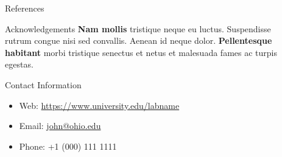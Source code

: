 \documentclass{beamer} %
\begin{document}
\begin{frame}[t]
\begin{columns}[t]
\begin{column}{0.465\textwidth}

\begin{block}{References}
	\nocite{*} %
	\small %
	\vspace{-1ex} %
\end{block}


\begin{block}{Acknowledgements}
	\textbf{Nam mollis} tristique neque eu luctus. Suspendisse rutrum congue nisi sed convallis. Aenean id neque dolor. \textbf{Pellentesque habitant} morbi tristique senectus et netus et malesuada fames ac turpis egestas.
\end{block}



\begin{block}{Contact Information}
	\begin{itemize}
		\item Web: \href{https://www.university.edu/labname}{https://www.university.edu/labname}
		\item Email: \href{mailto:john@ohio.edu}{john@ohio.edu}
		\item Phone: +1 (000) 111 1111
	\end{itemize}
\end{block}


\end{column} %

\begin{column}{0.02\textwidth}\end{column} %

\end{columns} %

\end{frame} %

\end{document}
